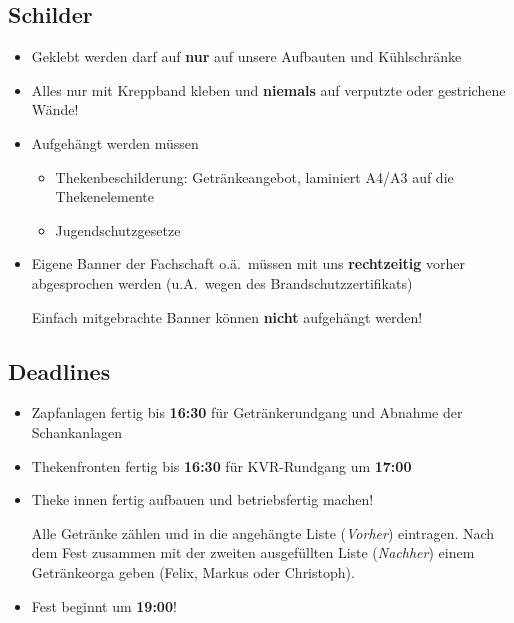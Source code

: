 \subsection{Schilder}
\begin{itemize}
  \item Geklebt werden darf auf \textbf{nur} auf unsere Aufbauten und Kühlschränke
  \item Alles nur mit Kreppband kleben und \textbf{niemals} auf verputzte oder gestrichene Wände!
  \item Aufgehängt werden müssen
    \begin{itemize}
      \item Thekenbeschilderung: Getränkeangebot, laminiert A4/A3 auf die Thekenelemente
      \item Jugendschutzgesetze
    \end{itemize}
  \item Eigene Banner der Fachschaft o.ä.\ müssen mit uns \textbf{rechtzeitig} vorher abgesprochen werden (u.A.\ wegen des Brandschutzzertifikats)

    Einfach mitgebrachte Banner können \textbf{nicht} aufgehängt werden!
\end{itemize}
\subsection{Deadlines}
\begin{itemize}
  \item Zapfanlagen fertig bis \textbf{16:30} für Getränkerundgang und Abnahme der Schankanlagen
  \item Thekenfronten fertig bis \textbf{16:30} für KVR-Rundgang um \textbf{17:00}
  \item Theke innen fertig aufbauen und betriebsfertig machen!

    Alle Getränke zählen und in die angehängte Liste (\emph{Vorher}) eintragen. Nach dem Fest zusammen mit der zweiten ausgefüllten Liste (\emph{Nachher}) einem Getränkeorga geben (Felix, Markus oder Christoph).
  \item \large{Fest beginnt um \textbf{19:00}!}
\end{itemize}
